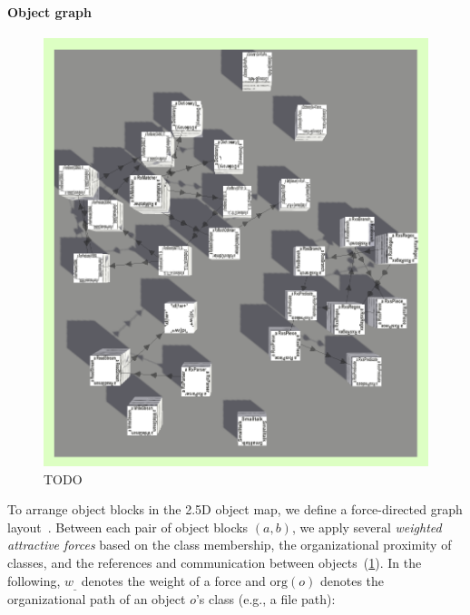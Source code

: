 \paragraph{Object graph}
\label{sec:visualization_approach/mapping/object_graph}

\begin{figure}
	\includegraphics[height=.25\textheight]{sections/03_visualization_approach/mapping/object_graph}
	\caption{TODO}
	\label{fig:visualization_approach/mapping/object_graph}
\end{figure}

To arrange object blocks in the 2.5D object map, we define a force-directed graph layout~\cite{fruchterman1991graph}.
Between each pair of object blocks $(a, b)$, we apply several \emph{weighted attractive forces} based on the class membership, the organizational proximity of classes, and the references and communication between objects~(\cref{fig:visualization_approach/mapping/object_graph}).
In the following, $w_{\_}$ denotes the weight of a force and $\text{org}(o)$ denotes the organizational path of an object $o$'s class (e.g., a file path):

